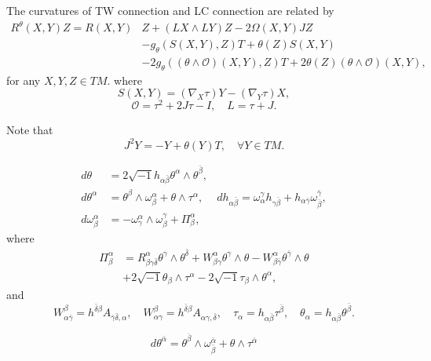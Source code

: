 \begin{theorem}
  The curvatures of  TW connection and LC connection  are related by 
  $$ \begin{aligned}
    R^\theta(X, Y) Z=R(X, Y) & Z+(L X \wedge L Y) Z-2 \Omega(X, Y) J Z \\
    & -g_\theta(S(X, Y), Z) T+\theta(Z) S(X, Y) \\
    & -2 g_\theta((\theta \wedge \mathcal{O})(X, Y), Z) T+2 \theta(Z)(\theta \wedge \mathcal{O})(X, Y),
    \end{aligned} $$
    for any $X,Y,Z \in TM$. 
    where 
    $$ S(X,Y)=(\nabla _{X}\tau )Y-(\nabla _{Y}\tau )X ,$$
    $$ \mathcal{O}=\tau ^2+2J \tau -I ,\quad L=\tau +J.$$
\end{theorem}
\begin{remark}
   Note that 
   $$ J^2Y=-Y+\theta (Y)T, \quad \forall Y \in TM. $$ 
\end{remark}

\begin{theorem}
    \begin{equation}
    \begin{aligned}
d\theta & =2\sqrt{-1}h_{\alpha\bar{\beta}}\theta^{\alpha}\wedge\theta^{\bar\beta},  \\
d\theta^{\alpha}& =\theta^\beta\wedge\omega_\beta^\alpha+\theta\wedge\tau^\alpha, & dh_{\alpha\bar{\beta}}=\omega_{\alpha}^{\gamma}h_{\gamma\bar{\beta}}+h_{\alpha\bar{\gamma}}\omega_{\bar{\beta}}^{\bar{\gamma}},  \\
d\omega_\beta^{\alpha}& =-\omega_\gamma^\alpha\wedge\omega_\beta^\gamma+\Pi_\beta^\alpha, 
\end{aligned}
\end{equation}
where
\begin{equation}
\begin{aligned}
\Pi_\beta^\alpha&=R_{\beta\gamma\bar\delta}^\alpha\theta^\gamma\wedge\theta^{\bar\delta}+W_{\beta\gamma}^\alpha\theta^\gamma\wedge\theta-W_{\beta\bar\gamma}^\alpha\theta^{\bar\gamma}\wedge\theta\\&
+2\sqrt{-1}\theta_\beta\wedge\tau^\alpha-2\sqrt{-1}\tau_\beta\wedge\theta^\alpha,
\end{aligned}
\end{equation}
and
\begin{equation}
    W_{\alpha \bar{\gamma}}^{\beta}=h^{\bar{\delta} \beta} A_{\bar{\gamma} \bar{\delta}, \alpha}, \quad W_{\alpha \gamma}^{\beta}=h^{\bar{\delta} \beta} A_{\alpha \gamma, \bar{\delta}}, \quad \tau_{\alpha}=h_{\alpha \bar{\beta}} \tau^{\bar{\beta}}, \quad \theta_{\alpha}=h_{\alpha \bar{\beta}} \theta^{\bar{\beta}}.
\end{equation}
\end{theorem}
\begin{remark}
    \begin{equation}
d\theta^{\bar\alpha}=\theta^{\bar\beta}\wedge\omega_{\bar\beta}^{\bar\alpha}+\theta\wedge\tau^{\bar\alpha}
    \end{equation}
\end{remark}

